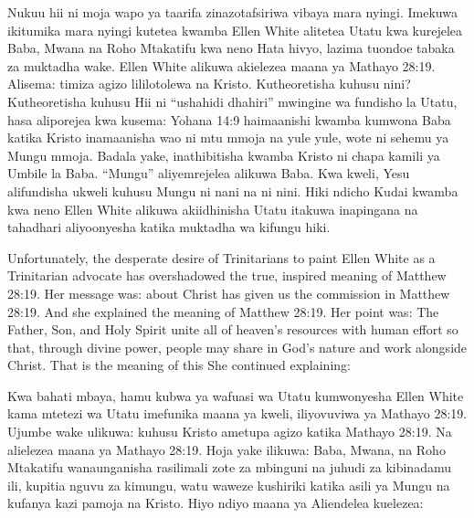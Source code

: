 Nukuu hii ni moja wapo ya taarifa zinazotafsiriwa vibaya mara nyingi. Imekuwa ikitumika mara nyingi kutetea kwamba Ellen White alitetea Utatu kwa kurejelea Baba, Mwana na Roho Mtakatifu kwa neno  Hata hivyo, lazima tuondoe tabaka za muktadha wake. Ellen White alikuwa akielezea maana ya Mathayo 28:19. Alisema:  timiza agizo lililotolewa na Kristo. Kutheoretisha kuhusu nini? Kutheoretisha kuhusu  Hii ni “ushahidi dhahiri” mwingine wa fundisho la Utatu, hasa aliporejea  kwa kusema:  Yohana 14:9 haimaanishi kwamba kumwona Baba katika Kristo inamaanisha wao ni mtu mmoja na yule yule, wote ni sehemu ya Mungu mmoja. Badala yake, inathibitisha kwamba Kristo ni chapa kamili ya Umbile la Baba. “Mungu” aliyemrejelea alikuwa Baba. Kwa kweli, Yesu alifundisha ukweli kuhusu Mungu ni nani na ni nini. Hiki ndicho   Kudai kwamba kwa neno  Ellen White alikuwa akiidhinisha Utatu itakuwa inapingana na tahadhari aliyoonyesha katika muktadha wa kifungu hiki.


Unfortunately, the desperate desire of Trinitarians to paint Ellen White as a Trinitarian advocate has overshadowed the true, inspired meaning of Matthew 28:19. Her message was:  about  Christ has given us the commission in Matthew 28:19. And she explained the meaning of Matthew 28:19. Her point was: The Father, Son, and Holy Spirit unite all of heaven’s resources with human effort so that, through divine power, people may share in God’s nature and work alongside Christ. That is the meaning of this  She continued explaining:


Kwa bahati mbaya, hamu kubwa ya wafuasi wa Utatu kumwonyesha Ellen White kama mtetezi wa Utatu imefunika maana ya kweli, iliyovuviwa ya Mathayo 28:19. Ujumbe wake ulikuwa:  kuhusu  Kristo ametupa agizo katika Mathayo 28:19. Na alielezea maana ya Mathayo 28:19. Hoja yake ilikuwa: Baba, Mwana, na Roho Mtakatifu wanaunganisha rasilimali zote za mbinguni na juhudi za kibinadamu ili, kupitia nguvu za kimungu, watu waweze kushiriki katika asili ya Mungu na kufanya kazi pamoja na Kristo. Hiyo ndiyo maana ya  Aliendelea kuelezea:



